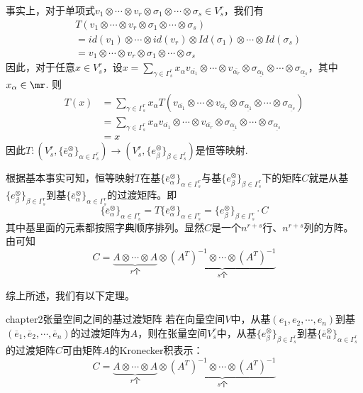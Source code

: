 事实上，对于单项式$v_{1}\otimes\cdots\otimes v_{r}\otimes \sigma_{1}\otimes\cdots\otimes \sigma_{s}\in V^{r}_{s}$，我们有
\[
\begin{split}
&T(v_{1}\otimes\cdots\otimes v_{r}\otimes \sigma_{1}\otimes\cdots\otimes \sigma_{s})\\
&=id(v_{1})\otimes\cdots\otimes id(v_{r})\otimes Id(\sigma_{1})\otimes\cdots\otimes Id(\sigma_{s})\\
&=v_{1}\otimes\cdots\otimes v_{r}\otimes \sigma_{1}\otimes\cdots\otimes \sigma_{s}
\end{split}
\]
因此，对于任意$x\in V^{r}_{s}$，设$x=\sum_{ \gamma\in \Gamma^{r}_{s} }x_{\alpha}v_{\overline{\alpha_{ 1 }}}\otimes\cdots\otimes v_{\overline{\alpha_{ r }}}\otimes \sigma_{\underline{\alpha_{ 1 }}}\otimes\cdots\otimes \sigma_{\underline{\alpha_{ s }}}$，其中$x_{\alpha}\in \mr$. 则
\[
\begin{split}
T(x)&=\sum_{ \gamma\in \Gamma^{r}_{s} }x_{\alpha}T\left(v_{\overline{\alpha_{ 1 }}}\otimes\cdots\otimes v_{\overline{\alpha_{ r }}}\otimes \sigma_{\underline{\alpha_{ 1 }}}\otimes\cdots\otimes \sigma_{\underline{\alpha_{ s }}}\right)\\
&=\sum_{ \gamma\in \Gamma^{r}_{s} }x_{\alpha}v_{\overline{\alpha_{ 1 }}}\otimes\cdots\otimes v_{\overline{\alpha_{ r }}}\otimes \sigma_{\underline{\alpha_{ 1 }}}\otimes\cdots\otimes \sigma_{\underline{\alpha_{ s }}}\\
&=x
\end{split}
\]
因此$T:\left(V^{r}_{s},\{ \overline{e}^{\otimes}_{\alpha}\}_{\alpha\in \Gamma^{r}_{s}} \right)\longrightarrow \left(V^{r}_{s},\{e^{\otimes}_{\beta} \}_{\beta\in \Gamma^{r}_{s}} \right)$是恒等映射.

根据基本事实可知，恒等映射$T$在基$\{ \overline{e}^{\otimes}_{\alpha}\}_{\alpha\in \Gamma^{r}_{s}}$与基$\{e^{\otimes}_{\beta} \}_{\beta\in \Gamma^{r}_{s}} $下的矩阵$C$就是从基$\{e^{\otimes}_{\beta} \}_{\beta\in \Gamma^{r}_{s}} $到基$\{ \overline{e}^{\otimes}_{\alpha}\}_{\alpha\in \Gamma^{r}_{s}}$的过渡矩阵。即
\[
\{ \overline{e}^{\otimes}_{\alpha}\}_{\alpha\in \Gamma^{r}_{s}}=T\{ \overline{e}^{\otimes}_{\alpha}\}_{\alpha\in \Gamma^{r}_{s}}=\{e^{\otimes}_{\beta} \}_{\beta\in \Gamma^{r}_{s}}\cdot C
\]
其中基里面的元素都按照字典顺序排列。显然$C$是一个$n^{r+s}$行、$n^{r+s}$列的方阵。由可知
\[
C=\underbrace{A\otimes \cdots \otimes A}_{r\text{个}}\otimes \underbrace{(A^{T})^{-1}\otimes \cdots\otimes (A^{T})^{-1}}_{s\text{个}}
\]

综上所述，我们有以下定理。
\begin{mythm}{}{chapter2张量空间之间的基过渡矩阵}
	若在向量空间$V$中，从基$(e_{1},e_{2},\cdots,e_{n})$到基$(\overline{e}_{1},\overline{e}_{2},\cdots,\overline{e}_{n})$的过渡矩阵为$A$，则在张量空间$V^{r}_{s}$中，从基$\{e^{\otimes}_{\beta} \}_{\beta\in \Gamma^{r}_{s}} $到基$\{ \overline{e}^{\otimes}_{\alpha}\}_{\alpha\in \Gamma^{r}_{s}}$的过渡矩阵$C$可由矩阵$A$的Kronecker积表示：
	\[
	C=\underbrace{A\otimes \cdots \otimes A}_{r\text{个}}\otimes \underbrace{(A^{T})^{-1}\otimes \cdots\otimes (A^{T})^{-1}}_{s\text{个}}
	\]
\end{mythm}

